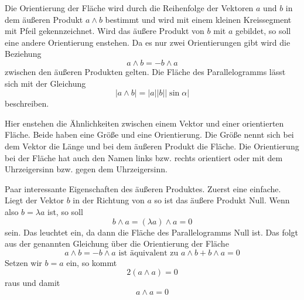 \documentclass[fleqn]{scrartcl}
\numberwithin{equation}{section}
\begin{document}
Die Orientierung der Fläche wird durch die Reihenfolge der Vektoren $a$ und
$b$ in dem äußeren Produkt $a\wedge b$ bestimmt und wird mit einem kleinen
Kreissegment mit Pfeil gekennzeichnet. Wird das äußere Produkt von $b$ mit $a$
gebildet, so soll eine andere Orientierung enstehen. Da es nur zwei
Orientierungen gibt wird die Beziehung
\[a\wedge b = - b\wedge a\]
zwischen den äußeren Produkten gelten. Die Fläche des Parallelogramms lässt
sich mit der Gleichung
\[|a\wedge b| = |a||b||\sin\alpha|\]
beschreiben.

Hier enstehen die Ähnlichkeiten zwischen einem Vektor und einer orientierten
Fläche. Beide haben eine Größe und eine Orientierung. Die Größe nennt sich bei
dem Vektor die Länge und bei dem äußeren Produkt die Fläche. Die Orientierung
bei der Fläche hat auch den Namen links bzw. rechts orientiert oder mit dem
Uhrzeigersinn bzw. gegen dem Uhrzeigersinn.

Paar interessante Eigenschaften des äußeren Produktes. Zuerst eine einfache.
Liegt der Vektor $b$ in der Richtung von $a$ so ist das äußere Produkt Null.
Wenn also $b=\lambda a$ ist, so soll
\[b\wedge a = (\lambda a)\wedge a= 0\]
sein. Das leuchtet ein, da dann die Fläche des Parallelogramms Null ist. Das
folgt aus der genannten Gleichung über die Orientierung der Fläche
\[a\wedge b = - b\wedge a \textrm{ ist äquivalent zu } a\wedge b + b\wedge a = 0\]
Setzen wir $b = a$ ein, so kommt
\[2(a\wedge a)=0\]
raus und damit
\[a\wedge a = 0\]
\end{document}
